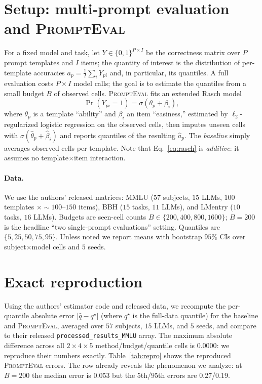 \documentclass[11pt]{article}
\newcommand{\pe}{\textsc{PromptEval}}
\begin{document}
\section{Setup: multi-prompt evaluation and \pe{}}\label{sec:setup}
For a fixed model and task, let $Y\in\{0,1\}^{P\times I}$ be the correctness matrix over $P$
prompt templates and $I$ items; the quantity of interest is the distribution of per-template
accuracies $a_p=\frac1I\sum_i Y_{pi}$ and, in particular, its quantiles. A full evaluation
costs $P\times I$ model calls; the goal is to estimate the quantiles from a small budget $B$
of observed cells. \pe{} fits an extended Rasch model
\begin{equation}
\Pr(Y_{pi}=1)=\sigma(\theta_p+\beta_i),
\label{eq:rasch}
\end{equation}
where $\theta_p$ is a template ``ability'' and $\beta_i$ an item ``easiness,'' estimated by
$\ell_2$-regularized logistic regression on the observed cells, then imputes unseen cells with
$\sigma(\hat\theta_p+\hat\beta_i)$ and reports quantiles of the resulting $\hat a_p$. The
\emph{baseline} simply averages observed cells per template. Note that
Eq.~\eqref{eq:rasch} is \emph{additive}: it assumes no template$\times$item interaction.

\paragraph{Data.} We use the authors' released matrices: MMLU ($57$ subjects, $15$ LLMs,
$100$ templates $\times{\sim}100$--$150$ items), BBH ($15$ tasks, $11$ LLMs), and LMentry
($10$ tasks, $16$ LLMs). Budgets are seen-cell counts $B\in\{200,400,800,1600\}$; $B{=}200$ is
the headline ``two single-prompt evaluations'' setting. Quantiles are $\{5,25,50,75,95\}$.
Unless noted we report means with bootstrap $95\%$ CIs over subject$\times$model cells and $5$
seeds.

\section{Exact reproduction}\label{sec:repro}
Using the authors' estimator code and released data, we recompute the per-quantile absolute
error $|\hat q - q^\star|$ (where $q^\star$ is the full-data quantile) for the baseline and
\pe{}, averaged over $57$ subjects, $15$ LLMs, and $5$ seeds, and compare to their released
\texttt{processed\_results\_MMLU} array. The maximum absolute difference across all
$2\times4\times5$ method/budget/quantile cells is $\mathbf{0.0000}$: we reproduce their numbers
exactly. Table~\ref{tab:repro} shows the reproduced \pe{} errors. The row already reveals the
phenomenon we analyze: at $B{=}200$ the median error is $0.053$ but the $5$th/$95$th errors are
$0.27$/$0.19$.
\end{document}
